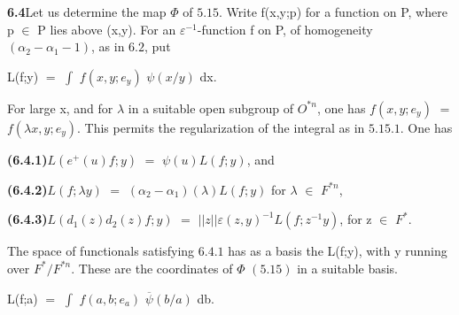 \documentclass[10pt,a4paper]{article}
\begin{document}
\par\noindent\textbf{6.4}\quad Let us determine the map $\Phi{}$ of $5.15$. Write f(x,y;p) for a function on P, where p $\in{}$ P lies above (x,y). For an $\varepsilon{}^{-1}$-function f on P, of homogeneity $(\alpha{}_2-\alpha{}_1-1)$, as in $6.2$, put\par
\par\smallskip\begin{center}\begin{minipage}{0.96\textwidth}\centering
L(f;y) $=$ $\int{}$ $f(x,y;e_y)$ $\psi{}(x/y)$ dx.
\end{minipage}\end{center}\smallskip
\par For large x, and for $\lambda{}$ in a suitable open subgroup of $O^{*n}$, one has $f(x,y;e_y)$ $=$ $f(\lambda{}x,y;e_y)$. This permits the regularization of the integral as in $5.15.1$. One has\par
\par\noindent\textbf{(6.4.1)}\quad $L(e^+(u)f;y)$ $=$ $\psi{}(u)L(f;y)$, and\par
\par\noindent\textbf{(6.4.2)}\quad $L(f;\lambda{}y)$ $=$ $(\alpha{}_2-\alpha{}_1)(\lambda{})L(f;y)$ for $\lambda{}$ $\in{}$ $F^{*n}$,\par
\par\noindent\textbf{(6.4.3)}\quad $L(d_1(z)d_2(z)f;y)$ $=$ $||z||\varepsilon{}(z,y)^{-1}L(f;z^{-1}y)$, for z $\in{}$ $F^*$.\par
\par The space of functionals satisfying $6.4.1$ has as a basis the L(f;y), with y running over $F^*/F^{*n}$. These are the coordinates of $\Phi{}$ $(5.15)$ in a suitable basis.\par
\par\medskip{}\par\smallskip
\par\smallskip\begin{center}\begin{minipage}{0.96\textwidth}\centering
L(f;a) $=$ $\int{}$ $f(a,b;e_a)$ $\overline{\psi{}}(b/a)$ db.
\end{minipage}\end{center}\smallskip
\end{document}
